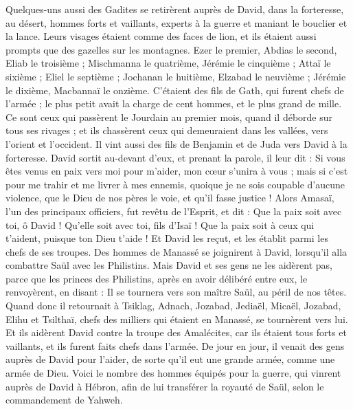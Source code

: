 \begin{multicols}{2}
Quelques-uns aussi des Gadites se retirèrent auprès de David, dans la forteresse, au désert, hommes forts et vaillants, experts à la guerre et maniant le bouclier et la lance. Leurs visages étaient comme des faces de lion, et ils étaient aussi prompts que des gazelles sur les montagnes.
Ezer le premier, Abdias le second, Eliab le troisième ;
Mischmanna le quatrième, Jérémie le cinquième ;
Attaï le sixième ; Eliel le septième ;
Jochanan le huitième, Elzabad le neuvième ;
Jérémie le dixième, Macbannaï le onzième.
C'étaient des fils de Gath, qui furent chefs de l'armée ; le plus petit avait la charge de cent hommes, et le plus grand de mille.
Ce sont ceux qui passèrent le Jourdain au premier mois, quand il déborde sur tous ses rivages ; et ils chassèrent ceux qui demeuraient dans les vallées, vers l'orient et l'occident.
Il vint aussi des fils de Benjamin et de Juda vers David à la forteresse.
David sortit au-devant d'eux, et prenant la parole, il leur dit : Si vous êtes venus en paix vers moi pour m'aider, mon cœur s'unira à vous ; mais si c'est pour me trahir et me livrer à mes ennemis, quoique je ne sois coupable d'aucune violence, que le Dieu de nos pères le voie, et qu'il fasse justice !
Alors Amasaï, l'un des principaux officiers, fut revêtu de l'Esprit, et dit : Que la paix soit avec toi, ô David ! Qu'elle soit avec toi, fils d'Isaï ! Que la paix soit à ceux qui t'aident, puisque ton Dieu t'aide ! Et David les reçut, et les établit parmi les chefs de ses troupes.
Des hommes de Manassé se joignirent à David, lorsqu'il alla combattre Saül avec les Philistins. Mais David et ses gens ne les aidèrent pas, parce que les princes des Philistins, après en avoir délibéré entre eux, le renvoyèrent, en disant : Il se tournera vers son maître Saül, au péril de nos têtes.
Quand donc il retournait à Tsiklag, Adnach, Jozabad, Jediaël, Micaël, Jozabad, Elihu et Tsilthaï, chefs des milliers qui étaient en Manassé, se tournèrent vers lui.
Et ils aidèrent David contre la troupe des Amalécites, car ils étaient tous forts et vaillants, et ils furent faits chefs dans l'armée.
De jour en jour, il venait des gens auprès de David pour l'aider, de sorte qu'il eut une grande armée, comme une armée de Dieu.
Voici le nombre des hommes équipés pour la guerre, qui vinrent auprès de David à Hébron, afin de lui transférer la royauté de Saül, selon le commandement de Yahweh.

\end{multicols}
